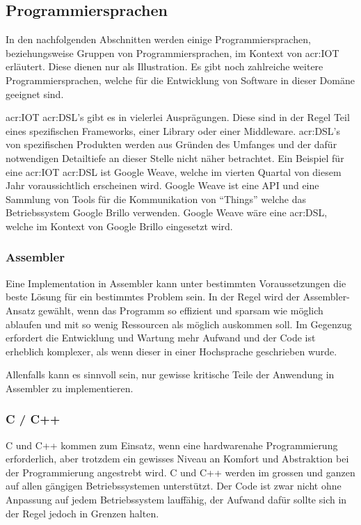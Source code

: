 \subsection{Programmiersprachen}
In den nachfolgenden Abschnitten werden einige Programmiersprachen, beziehungsweise Gruppen von Programmiersprachen, im Kontext von \gls{acr:IOT} erläutert. Diese dienen nur als Illustration. Es gibt noch zahlreiche weitere Programmiersprachen, welche für die Entwicklung von Software in dieser Domäne geeignet sind.

\gls{acr:IOT} \gls{acr:DSL}'s gibt es in vielerlei Ausprägungen. Diese sind in der Regel Teil eines spezifischen Frameworks, einer Library oder einer Middleware. \gls{acr:DSL}'s von spezifischen Produkten werden aus Gründen des Umfanges und der dafür notwendigen Detailtiefe an dieser Stelle nicht näher betrachtet. Ein Beispiel für eine \gls{acr:IOT} \gls{acr:DSL} ist Google Weave, welche im vierten Quartal von diesem Jahr voraussichtlich erscheinen wird. Google Weave ist eine API und eine Sammlung von Tools für die Kommunikation von "`Things"' welche das Betriebssystem Google Brillo verwenden. Google Weave wäre eine \gls{acr:DSL}, welche im Kontext von Google Brillo eingesetzt wird. 

\subsubsection{Assembler}
Eine Implementation in Assembler kann unter bestimmten Voraussetzungen die beste Lösung für ein bestimmtes Problem sein. In der Regel wird der Assembler-Ansatz gewählt, wenn das Programm so effizient und sparsam wie möglich ablaufen und mit so wenig Ressourcen als möglich auskommen soll. Im Gegenzug erfordert die Entwicklung und Wartung mehr Aufwand und der Code ist erheblich komplexer, als wenn dieser in einer Hochsprache geschrieben wurde.

Allenfalls kann es sinnvoll sein, nur gewisse kritische Teile der Anwendung in Assembler zu implementieren.


\subsubsection{C / C++}
C und C++ kommen zum Einsatz, wenn eine hardwarenahe Programmierung erforderlich, aber trotzdem ein gewisses Niveau an Komfort und Abstraktion bei der Programmierung angestrebt wird. C und C++ werden im grossen und ganzen auf allen gängigen Betriebssystemen unterstützt. Der Code ist zwar nicht ohne Anpassung auf jedem Betriebssystem lauffähig, der Aufwand dafür sollte sich in der Regel jedoch in Grenzen halten.


